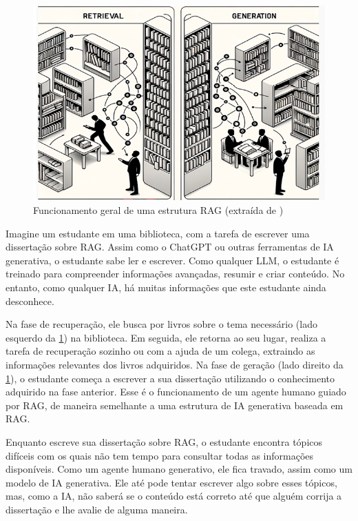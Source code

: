 \documentclass[a4paper, 12pt]{article}
\newcommand{\citeb}[1]{\bibleftbracket\cite{#1}\bibrightbracket}
\begin{document}
    \begin{figure}[h]
        \label{fig:rag_estudante}
        \includegraphics[width=\textwidth,height=0.9\textheight,keepaspectratio]{retrieval-generation-denis-rothman.png}
        \centering
        \caption{Funcionamento geral de uma estrutura RAG (extraída de \citeb{rothman})}
        \centering
    \end{figure}

    Imagine um estudante em uma biblioteca, com a tarefa de escrever uma dissertação sobre RAG. Assim como o ChatGPT ou outras ferramentas de IA generativa, o estudante sabe ler e escrever. Como qualquer LLM, o estudante é treinado para compreender informações avançadas, resumir e criar conteúdo. No entanto, como qualquer IA, há muitas informações que este estudante ainda desconhece.

    Na fase de recuperação, ele busca por livros sobre o tema necessário (lado esquerdo da \ref{fig:rag_estudante}) na biblioteca. Em seguida, ele retorna ao seu lugar, realiza a tarefa de recuperação sozinho ou com a ajuda de um colega, extraindo as informações relevantes dos livros adquiridos. Na fase de geração (lado direito da \ref{fig:rag_estudante}), o estudante começa a escrever a sua dissertação utilizando o conhecimento adquirido na fase anterior. Esse é o funcionamento de um agente humano guiado por RAG, de maneira semelhante a uma estrutura de IA generativa baseada em RAG.

    Enquanto escreve sua dissertação sobre RAG, o estudante encontra tópicos difíceis com os quais não tem tempo para consultar todas as informações disponíveis. Como um agente humano generativo, ele fica travado, assim como um modelo de IA generativa. Ele até pode tentar escrever algo sobre esses tópicos, mas, como a IA, não saberá se o conteúdo está correto até que alguém corrija a dissertação e lhe avalie de alguma maneira.
\end{document}
